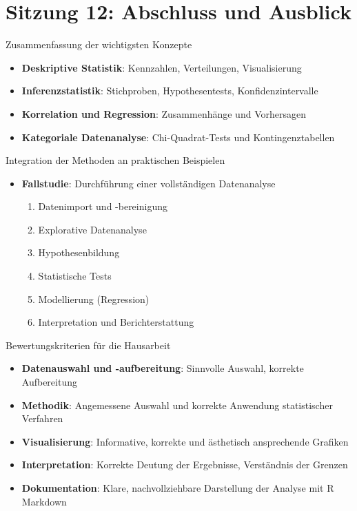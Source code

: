 \documentclass[
  ignorenonframetext,
]{beamer}
\providecommand{\tightlist}{%
  \setlength{\itemsep}{0pt}\setlength{\parskip}{0pt}}
\begin{document}
\section{Sitzung 12: Abschluss und
Ausblick}\label{sitzung-12-abschluss-und-ausblick}

\begin{frame}{Zusammenfassung der wichtigsten Konzepte}
\protect{}\label{zusammenfassung-der-wichtigsten-konzepte}
\begin{itemize}
\tightlist
\item
  \textbf{Deskriptive Statistik}: Kennzahlen, Verteilungen,
  Visualisierung
\item
  \textbf{Inferenzstatistik}: Stichproben, Hypothesentests,
  Konfidenzintervalle
\item
  \textbf{Korrelation und Regression}: Zusammenhänge und Vorhersagen
\item
  \textbf{Kategoriale Datenanalyse}: Chi-Quadrat-Tests und
  Kontingenztabellen
\end{itemize}
\end{frame}

\begin{frame}{Integration der Methoden an praktischen Beispielen}
\protect{}\label{integration-der-methoden-an-praktischen-beispielen}
\begin{itemize}
\tightlist
\item
  \textbf{Fallstudie}: Durchführung einer vollständigen Datenanalyse

  \begin{enumerate}
  \tightlist
  \item
    Datenimport und -bereinigung
  \item
    Explorative Datenanalyse
  \item
    Hypothesenbildung
  \item
    Statistische Tests
  \item
    Modellierung (Regression)
  \item
    Interpretation und Berichterstattung
  \end{enumerate}
\end{itemize}
\end{frame}

\begin{frame}{Bewertungskriterien für die Hausarbeit}
\protect{}\label{bewertungskriterien-fuxfcr-die-hausarbeit}
\begin{itemize}
\tightlist
\item
  \textbf{Datenauswahl und -aufbereitung}: Sinnvolle Auswahl, korrekte
  Aufbereitung
\item
  \textbf{Methodik}: Angemessene Auswahl und korrekte Anwendung
  statistischer Verfahren
\item
  \textbf{Visualisierung}: Informative, korrekte und ästhetisch
  ansprechende Grafiken
\item
  \textbf{Interpretation}: Korrekte Deutung der Ergebnisse, Verständnis
  der Grenzen
\item
  \textbf{Dokumentation}: Klare, nachvollziehbare Darstellung der
  Analyse mit R Markdown
\end{itemize}
\end{frame}
\end{document}
